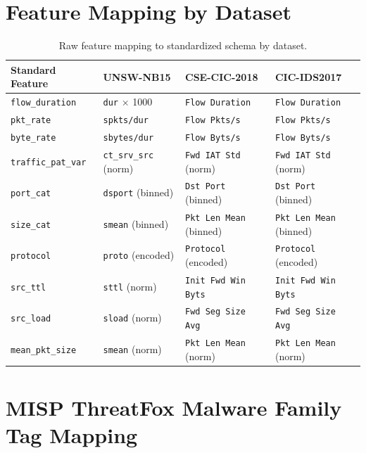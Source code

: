 \documentclass[12pt, letterpaper, oneside]{report}
\begin{document}
\begin{appendices}

\chapter{Feature Mapping by Dataset}
\label{app:feature_mapping}

\begin{table}[htbp]
\centering
\caption{Raw feature mapping to standardized schema by dataset.}
\label{tab:feature_mapping_full}
\small
\begin{tabular}{llll}
\toprule
\textbf{Standard Feature} & \textbf{UNSW-NB15} & \textbf{CSE-CIC-2018} & \textbf{CIC-IDS2017} \\
\midrule
\texttt{flow\_duration} & \texttt{dur} $\times$ 1000 & \texttt{Flow Duration} & \texttt{Flow Duration} \\
\texttt{pkt\_rate} & \texttt{spkts/dur} & \texttt{Flow Pkts/s} & \texttt{Flow Pkts/s} \\
\texttt{byte\_rate} & \texttt{sbytes/dur} & \texttt{Flow Byts/s} & \texttt{Flow Byts/s} \\
\texttt{traffic\_pat\_var} & \texttt{ct\_srv\_src} (norm) & \texttt{Fwd IAT Std} (norm) & \texttt{Fwd IAT Std} (norm) \\
\texttt{port\_cat} & \texttt{dsport} (binned) & \texttt{Dst Port} (binned) & \texttt{Dst Port} (binned) \\
\texttt{size\_cat} & \texttt{smean} (binned) & \texttt{Pkt Len Mean} (binned) & \texttt{Pkt Len Mean} (binned) \\
\texttt{protocol} & \texttt{proto} (encoded) & \texttt{Protocol} (encoded) & \texttt{Protocol} (encoded) \\
\texttt{src\_ttl} & \texttt{sttl} (norm) & \texttt{Init Fwd Win Byts} & \texttt{Init Fwd Win Byts} \\
\texttt{src\_load} & \texttt{sload} (norm) & \texttt{Fwd Seg Size Avg} & \texttt{Fwd Seg Size Avg} \\
\texttt{mean\_pkt\_size} & \texttt{smean} (norm) & \texttt{Pkt Len Mean} (norm) & \texttt{Pkt Len Mean} (norm) \\
\bottomrule
\end{tabular}
\end{table}


\chapter{MISP ThreatFox Malware Family Tag Mapping}
\label{app:misp_tags}


\end{appendices}
\end{document}
